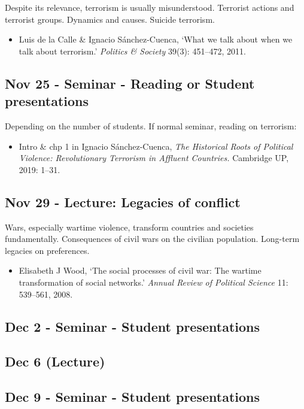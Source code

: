 \documentclass[12pt, a4paper]{article}
\begin{document}
Despite its relevance, terrorism is usually misunderstood. Terrorist actions and terrorist groups. Dynamics and causes. Suicide terrorism.

\begin{itemize}
\setlength\itemsep{0pt}
\item Luis de la Calle \& Ignacio Sánchez-Cuenca, `What we talk about when we talk about terrorism.' \textit{Politics \& Society} 39(3): 451--472, 2011.
\end{itemize}

\subsection*{Nov 25 - Seminar - Reading or Student presentations}

Depending on the number of students. If normal seminar, reading on terrorism:

\begin{itemize}
\setlength\itemsep{0pt}
\item Intro \& chp 1 in Ignacio Sánchez-Cuenca, \textit{The Historical Roots of Political Violence: Revolutionary Terrorism in Affluent Countries.} Cambridge UP, 2019: 1--31.
\end{itemize}

\subsection*{Nov 29 - Lecture: Legacies of conflict}

Wars, especially wartime violence, transform countries and societies fundamentally. Consequences of civil wars on the civilian population. Long-term legacies on preferences.

\begin{itemize}
\setlength\itemsep{0pt}
\item Elisabeth J Wood, `The social processes of civil war: The wartime transformation of social networks.' \textit{Annual Review of Political Science} 11: 539--561, 2008.
\end{itemize}

\subsection*{Dec 2 - Seminar - Student presentations}

\subsection*{Dec 6 (Lecture) {\color{red}{No class}}}

\subsection*{Dec 9 - Seminar - Student presentations}
\end{document}
